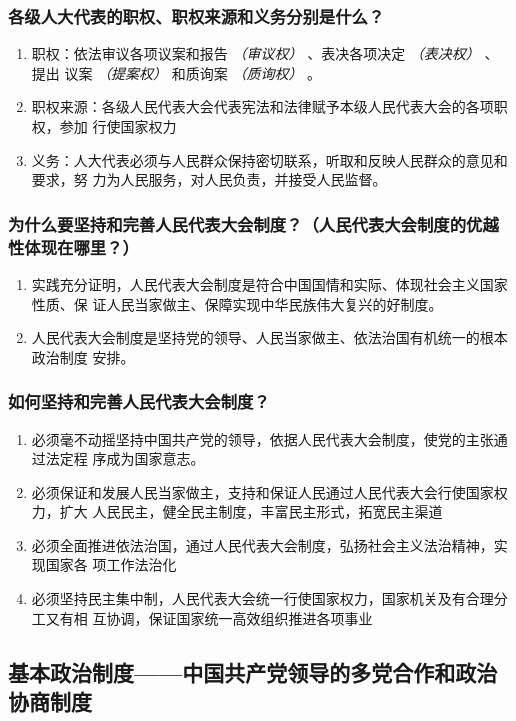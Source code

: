 \documentclass[11pt]{article}
\begin{document}
\subsubsection{各级人大代表的职权、职权来源和义务分别是什么？}
\label{sec:orgc534f78}
\begin{enumerate}
\item 职权：依法审议各项议案和报告 \emph{（审议权）} 、表决各项决定 \emph{（表决权）} 、提出
议案 \emph{（提案权）} 和质询案 \emph{（质询权）} 。
\item 职权来源：各级人民代表大会代表宪法和法律赋予本级人民代表大会的各项职权，参加
行使国家权力
\item 义务：人大代表必须与人民群众保持密切联系，听取和反映人民群众的意见和要求，努
力为人民服务，对人民负责，并接受人民监督。
\end{enumerate}
\subsubsection{为什么要坚持和完善人民代表大会制度？（人民代表大会制度的优越性体现在哪里？）}
\label{sec:org6f6c98a}
\begin{enumerate}
\item 实践充分证明，人民代表大会制度是符合中国国情和实际、体现社会主义国家性质、保
证人民当家做主、保障实现中华民族伟大复兴的好制度。
\item 人民代表大会制度是坚持党的领导、人民当家做主、依法治国有机统一的根本政治制度
安排。
\end{enumerate}
\subsubsection{如何坚持和完善人民代表大会制度？}
\label{sec:org9f3ef6c}
\begin{enumerate}
\item 必须毫不动摇坚持中国共产党的领导，依据人民代表大会制度，使党的主张通过法定程
序成为国家意志。
\item 必须保证和发展人民当家做主，支持和保证人民通过人民代表大会行使国家权力，扩大
人民民主，健全民主制度，丰富民主形式，拓宽民主渠道
\item 必须全面推进依法治国，通过人民代表大会制度，弘扬社会主义法治精神，实现国家各
项工作法治化
\item 必须坚持民主集中制，人民代表大会统一行使国家权力，国家机关及有合理分工又有相
互协调，保证国家统一高效组织推进各项事业
\end{enumerate}
\subsection{基本政治制度——中国共产党领导的多党合作和政治协商制度}
\label{sec:org7f30720}
\end{document}
